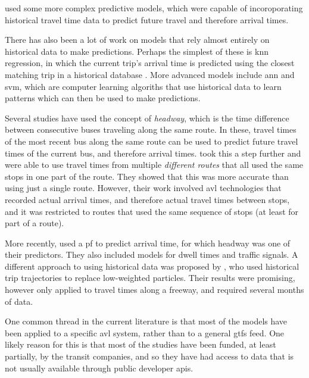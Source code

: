 \documentclass[12pt,a4paper]{article}
\begin{document}
\cite{cathey-dailey:2003} used some more complex predictive models, 
which were capable of incoroporating historical travel time
data to predict future travel and therefore arrival times.

There has also been a lot of work on models that rely almost entirely on historical 
data to make predictions.
Perhaps the simplest of these is \gls{knn} regression,
in which the current trip's arrival time is predicted using the closest
matching trip in a historical database \citep{cn}.
More advanced models include \gls{ann} and \gls{svm},
which are computer learning algoriths that use historical data to
learn patterns which can then be used to make predictions.


Several studies have used the concept of \emph{headway},
which is the time difference between consecutive buses traveling along the same route.
In these, travel times of the most recent bus along the same route can be used
to predict future travel times of the current bus, and therefore arrival times.
\cite{yu-etal:2011} took this a step further and were able to use travel times
from multiple \emph{different routes} that all used the same stops in one part of the route.
They showed that this was more accurate than using just a single route.
However, their work involved \gls{avl} technologies that recorded actual arrival times,
and therefore actual travel times between stops,
and it was restricted to routes that used the same sequence of stops (at least for part of a route).


More recently, \cite{hans-etal:2015} used a \gls{pf} to predict arrival time, 
for which headway was one of their predictors.
They also included models for dwell times and traffic signals.
A different approach to using historical data was proposed by \cite{chen-rakha:2014}, 
who used historical trip trajectories to replace low-weighted particles.
Their results were promising, however only applied to travel times along a freeway,
and required several months of data.


One common thread in the current literature is that most of the models have been applied to a
specific \gls{avl} system, rather than to a general \gls{gtfs} feed.
One likely reason for this is that most of the studies have been funded,
at least partially, by the transit companies, and so they have had access to data
that is not usually available through public developer \glspl{api}.





\end{document}
